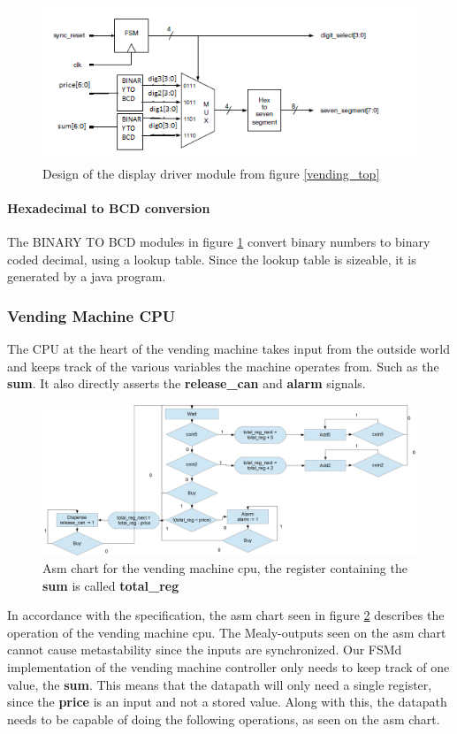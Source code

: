 \begin{figure}
    \center
    \includegraphics{pictures/display_sch.png}
    \caption{Design of the display driver module from figure \ref{vending_top}}
    \label{display_sch}
\end{figure}

\paragraph{Hexadecimal to BCD conversion}
The BINARY TO BCD modules in figure \ref{display_sch} convert binary numbers to binary coded decimal, using a lookup table.
Since the lookup table is sizeable, it is generated by a java program.
\subsubsection{Vending Machine CPU}
The CPU at the heart of the vending machine takes input from the outside world and keeps track of the various variables the machine operates from. 
Such as the \textbf{sum}. It also directly asserts the \textbf{release\_can} and \textbf{alarm} signals. 

\begin{figure}
    \center
    \includegraphics[scale=0.3]{pictures/cola_asm.png}
    \caption{Asm chart for the vending machine cpu, the register containing the \textbf{sum} is called \textbf{total\_reg}}
    \label{cola_asm}
\end{figure}
In accordance with the specification, the asm chart seen in figure \ref{cola_asm}
describes the operation of the vending machine cpu. The Mealy-outputs seen on the asm chart cannot cause metastability since the inputs are synchronized.
Our FSMd implementation of the vending machine controller only needs to keep track of one value, the \textbf{sum}.
This means that the datapath will only need a single register, since the \textbf{price} is an input and not a stored value.
Along with this, the datapath needs to be capable of doing the following operations, as seen on the asm chart. \\


